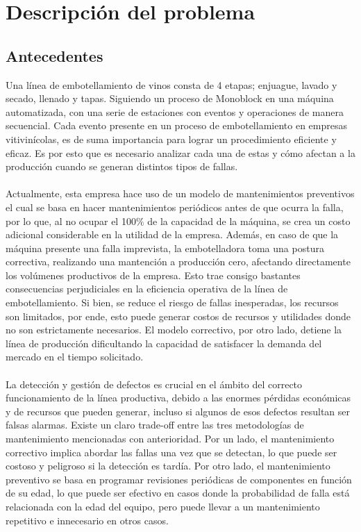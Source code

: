 \documentclass[10pt]{article}
\begin{document}
\section{Descripción del problema}

\subsection{Antecedentes}

Una línea de embotellamiento de vinos consta de 4 etapas; enjuague, lavado y secado, llenado y tapas. Siguiendo un proceso de Monoblock en una máquina automatizada, con una serie de estaciones con eventos y operaciones de manera secuencial. Cada evento presente en un proceso de embotellamiento en empresas vitivinícolas, es de suma importancia para lograr un procedimiento eficiente y eficaz. Es por esto que es necesario analizar cada una de estas y cómo afectan a la producción cuando se generan distintos tipos de fallas.  \\
\\
Actualmente, esta empresa hace uso de un modelo de mantenimientos preventivos el cual se basa en hacer mantenimientos periódicos antes de que ocurra la falla, por lo que, al no ocupar el 100${\%}$ de la capacidad de la máquina, se crea un costo adicional considerable en la utilidad de la empresa. Además, en caso de que la máquina presente una falla imprevista, la embotelladora toma una postura correctiva, realizando una mantención a producción cero, afectando directamente los volúmenes productivos de la empresa. Esto trae consigo bastantes consecuencias perjudiciales en la eficiencia operativa de la línea de embotellamiento. Si bien, se reduce el riesgo de fallas inesperadas, los recursos son limitados, por ende, esto puede generar costos de recursos y utilidades donde no son estrictamente necesarios. El modelo correctivo, por otro lado, detiene la línea de producción dificultando la capacidad de satisfacer la demanda del mercado en el tiempo solicitado. \\
\\
La detección y gestión de defectos es crucial en el ámbito del correcto funcionamiento de la línea productiva, debido a las enormes pérdidas económicas y de recursos que pueden generar, incluso si algunos de esos defectos resultan ser falsas alarmas. Existe un claro trade-off entre las tres metodologías de mantenimiento mencionadas con anterioridad. Por un lado, el mantenimiento correctivo implica abordar las fallas una vez que se detectan, lo que puede ser costoso y peligroso si la detección es tardía. Por otro lado, el mantenimiento preventivo se basa en programar revisiones periódicas de componentes en función de su edad, lo que puede ser efectivo en casos donde la probabilidad de falla está relacionada con la edad del equipo, pero puede llevar a un mantenimiento repetitivo e innecesario en otros casos.\\
\end{document}
